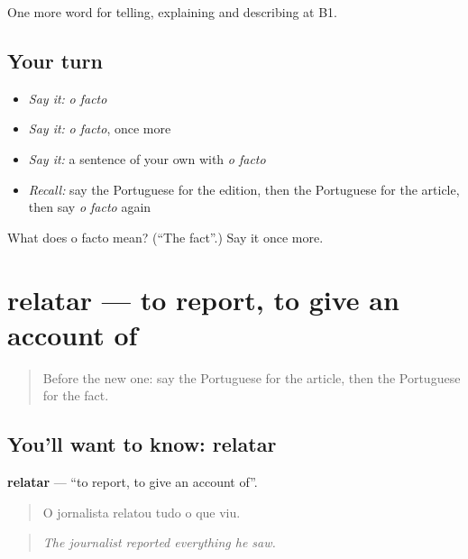 \begin{grammarlens}[title={What you've built}]
One more word for telling, explaining and describing at B1.
\end{grammarlens}

\subsection*{Your turn}
\begin{itemize}
\raggedright
  \item \emph{Say it:} \emph{o facto}
  \item \emph{Say it:} \emph{o facto}, once more
  \item \emph{Say it:} a sentence of your own with \emph{o facto}
  \item \emph{Recall:} say the Portuguese for the edition, then the Portuguese for the article, then say \emph{o facto} again
\end{itemize}

\begin{tcolorbox}[breakable,colback=teal!4,colframe=teal!35!black,title={Before you move on}]
What does o facto mean? (\textquotedblleft{}The fact\textquotedblright{}.) Say it once more.
\end{tcolorbox}
\section[relatar]{relatar — to report, to give an account of}

\label{lesson:PT-C281-relatar}



\begin{quote}
Before the new one: say the Portuguese for the article, then the Portuguese for the fact.
\end{quote}

\subsection*{You'll want to know: relatar}
\textbf{relatar} — \textquotedblleft{}to report, to give an account of\textquotedblright{}.

\begin{quote}
O jornalista relatou tudo o que viu.
\end{quote}

\begin{quote}
\emph{The journalist reported everything he saw.}
\end{quote}

